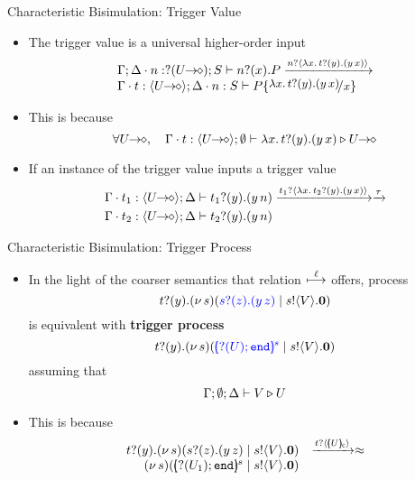 \documentclass{beamer}
\newcommand{\prcolor}[1]{{\color{blue} #1}}
\begin{document}
	\begin{frame}{Characteristic Bisimulation: Trigger Value}
		\begin{itemize}
			\item	The trigger value is a universal higher-order input
				\[
				\begin{array}{l}
					\Gamma; \Delta \cat n: \btinp{\shot{U}} S \proves \binp{n}{x} P
					\by{\bactinp{n}{\abs{x}{\binp{t}{y} (\appl{y}{x})}}}\\
					\Gamma \cat t: \chtype{\shot{U}}; \Delta \cat n: S %
					\proves P \subst{\abs{x}{\binp{t}{y} (\appl{y}{x})}}{x} 
				\end{array}
				\]
			\item	This is because
				\[
					\forall \shot{U}, \quad \Gamma \cat t: \chtype{\shot{U}}; \es %
					\proves \abs{x}{\binp{t}{y} (\appl{y}{x})} \hastype \shot{U}
				\]

			\item	If an instance of the trigger value inputs a trigger value
				\begin{eqnarray*}
					\Gamma \cat t_1: \chtype{\shot{U}}; \Delta
					\proves \binp{t_1}{y} (\appl{y}{n}) & \by{\bactinp{t_1}{\abs{x}{\binp{t_2}{y} (\appl{y}{x})}}} \by{\tau}\\
					\Gamma \cat t_2: \chtype{\shot{U}}; \Delta
					\proves \binp{t_2}{y} (\appl{y}{n}) %
				\end{eqnarray*}
		\end{itemize}
	\end{frame}

	\begin{frame}{Characteristic Bisimulation: Trigger Process}
		\begin{itemize}
			\item	In the light of the coarser semantics that
				relation $\stackrel{\ell}{\longmapsto}$ offers, process
				\[
					\binp{t}{y}\newsp{s}{\prcolor{\binp{s}{z} (\appl{y}{z})} \Par \bout{s}{V} \inact}
				\]
				is equivalent with {\bf trigger process}
				\[
					\binp{t}{y}\newsp{s}{\prcolor{\mapchar{\btinp{U} \tinact}{s}} \Par \bout{s}{V} \inact}
				\]
				assuming that
				\[
					\Gamma; \emptyset; \Delta \vdash V \triangleright U
				\]
			\item	This is because
				\[
					\begin{array}{rl}
						\binp{t}{y} \newsp{s}{\binp{s}{z} (\appl{y}{z}) \Par \bout{s}{V} \inact}
						&\by{\bactinp{t}{\omapchar{U}}} \wbc \\
						\newsp{s}{\mapchar{\btinp{U_1} \tinact}{s} \Par \bout{s}{V} \inact} %
					\end{array}
				\]
		\end{itemize}
	\end{frame}
\end{document}
